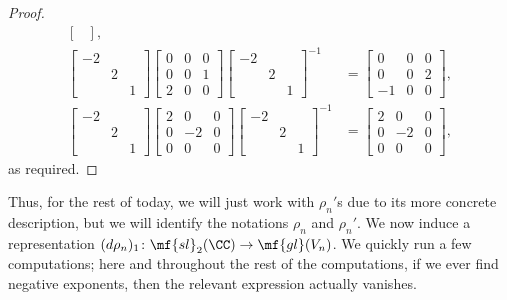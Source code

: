 \documentclass[../notes.tex]{subfiles}
\begin{document}
\begin{proof}
\begin{align*}
\begin{bmatrix}
		\end{bmatrix}, \\
		\begin{bmatrix}
			-2 \\ & 2 \\ & & 1
		\end{bmatrix}\begin{bmatrix}
			0 & 0 & 0 \\
			0 & 0 & 1 \\
			2 & 0 & 0
		\end{bmatrix}\begin{bmatrix}
			-2 \\ & 2 \\ & & 1
		\end{bmatrix}^{-1} &= \begin{bmatrix}
			0 & 0 & 0 \\
			0 & 0 & 2 \\
			-1 & 0 & 0
		\end{bmatrix}, \\
		\begin{bmatrix}
			-2 \\ & 2 \\ & & 1
		\end{bmatrix}\begin{bmatrix}
			2 & 0 & 0 \\
			0 & -2 & 0 \\
			0 & 0 & 0
		\end{bmatrix}\begin{bmatrix}
			-2 \\ & 2 \\ & & 1
		\end{bmatrix}^{-1} &= \begin{bmatrix}
			2 & 0 & 0 \\
			0 & -2 & 0 \\
			0 & 0 & 0
		\end{bmatrix},
	\end{align*}
	as required.
\end{proof}
Thus, for the rest of today, we will just work with $\rho_n'$s due to its more concrete description, but we will identify the notations $\rho_n$ and $\rho_n'$. We now induce a representation $(d\rho_n)_1\colon\mf{sl}_2(\CC)\to\mf{gl}(V_n)$. We quickly run a few computations; here and throughout the rest of the computations, if we ever find negative exponents, then the relevant expression actually vanishes.
\end{document}
